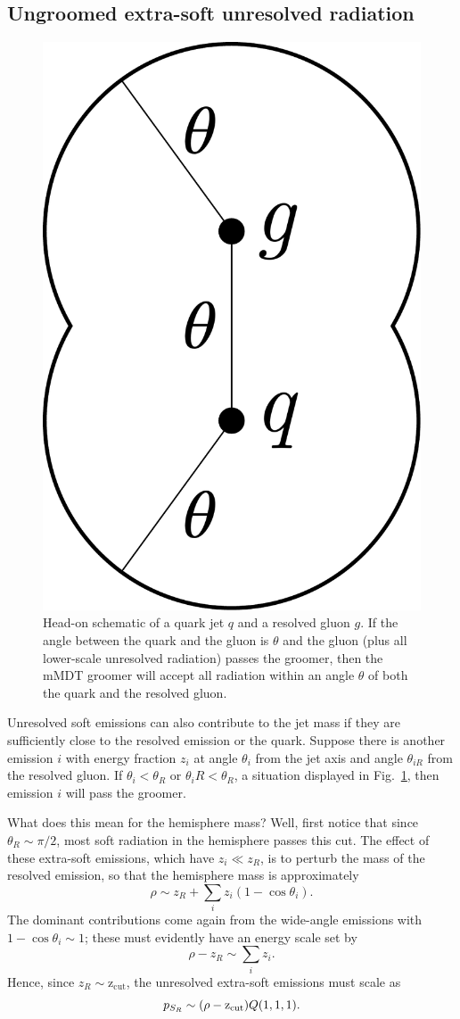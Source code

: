 \documentclass[../thesis.tex]{subfiles}
\providecommand{\zcut}{\mathrm{z_{cut}}}
\begin{document}
\subsection{Ungroomed extra-soft unresolved radiation}
	\begin{figure}
	\begin{centering}
		\includegraphics[width=0.2\columnwidth]{figures/head_on_schematic.pdf}
		\caption{\label{fig:head-on schematic}Head-on schematic of a quark jet $q$ and a resolved gluon $g$. If the angle between the quark and the gluon is $\theta$ and the gluon (plus all lower-scale unresolved radiation) passes the groomer, then the mMDT groomer will accept all radiation within an angle $\theta$ of both the quark and the resolved gluon.}
	\end{centering}
	\end{figure}
	Unresolved soft emissions can also contribute to the jet mass if they are sufficiently close to the resolved emission or the quark. Suppose there is another emission $i$ with energy fraction $z_i$ at angle $\theta_i$ from the jet axis and angle $\theta_{iR}$ from the resolved gluon. If $\theta_i < \theta_R$ or $\theta_iR < \theta_R$, a situation displayed in Fig.~\ref{fig:head-on schematic}, then emission $i$ will pass the groomer.

	What does this mean for the hemisphere mass? Well, first notice that since $\theta_R \sim \pi/2$, most soft radiation in the hemisphere passes this cut. The effect of these extra-soft emissions, which have $z_i \ll z_R$, is to perturb the mass of the resolved emission, so that the hemisphere mass is approximately
	\begin{equation}
		\rho \sim z_R + \sum_i z_i(1 - \cos\theta_i).
	\end{equation}
	The dominant contributions come again from the wide-angle emissions with $1 - \cos\theta_i \sim 1$; these must evidently have an energy scale set by
	\begin{equation}
		\rho - z_R \sim \sum_i z_i.
	\end{equation}
	Hence, since $z_R \sim \zcut$, the unresolved extra-soft emissions must scale as
	\begin{equation}
		p_{S_R} \sim \qty(\rho - \zcut)Q(1, 1, 1).
	\end{equation}
\end{document}
